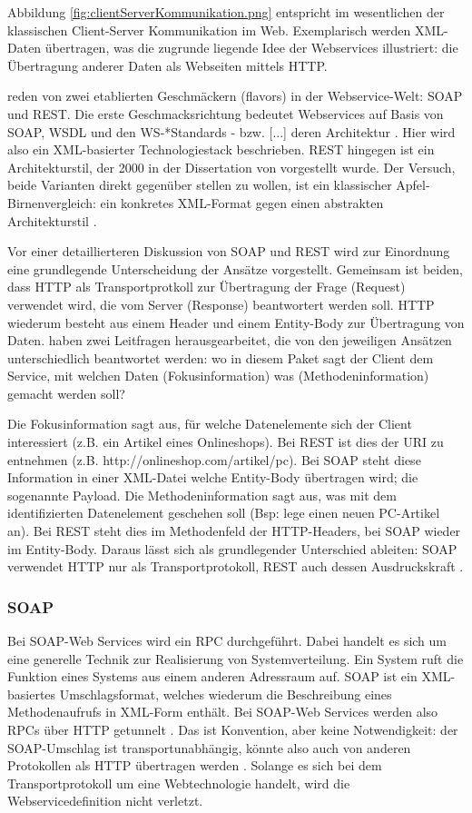 \documentclass[12pt,a4paper,bibliography=totocnumbered,listof=totoc]{scrartcl}
\begin{document}
Abbildung \ref{fig:clientServerKommunikation.png} entspricht im wesentlichen der klassischen Client-Server Kommunikation im Web. Exemplarisch werden XML-Daten übertragen, was die zugrunde liegende Idee der Webservices illustriert: die Übertragung anderer Daten als Webseiten mittels HTTP.

\citet{wilde11} reden von zwei etablierten \glqq Geschmäckern\grqq{} (flavors) in der Webservice-Welt: SOAP und REST. Die erste Geschmacksrichtung bedeutet Webservices \glqq auf Basis von SOAP, WSDL und den WS-*Standards - bzw. [...] deren Architektur\grqq{} \citep{tilkov11}. Hier wird also ein XML-basierter Technologiestack beschrieben. REST hingegen ist ein Architekturstil, der 2000 in der Dissertation von \citeauthor{fielding00} vorgestellt wurde. Der Versuch, beide Varianten direkt gegenüber stellen zu wollen, ist ein \glqq [...] klassischer Apfel-Birnenvergleich: ein konkretes XML-Format gegen einen abstrakten Architekturstil\grqq{} \citep{tilkov11}.

Vor einer detaillierteren Diskussion von SOAP und REST wird zur Einordnung eine grundlegende Unterscheidung der Ansätze vorgestellt. Gemeinsam ist beiden, dass HTTP als Transportprotkoll zur Übertragung der Frage (Request) verwendet wird, die vom Server (Response) beantwortert werden soll. HTTP wiederum besteht aus einem Header und einem Entity-Body zur Übertragung von Daten. \citet{richardson07} haben zwei Leitfragen herausgearbeitet, die von den jeweiligen Ansätzen unterschiedlich beantwortet werden: wo in diesem Paket sagt der Client dem Service, mit welchen Daten (Fokusinformation) was (Methodeninformation) gemacht werden soll?

Die Fokusinformation sagt aus, für welche Datenelemente sich der Client interessiert (z.B. ein Artikel eines Onlineshops). Bei REST ist dies der URI zu entnehmen (z.B. http://onlineshop.com/artikel/pc). Bei SOAP steht diese Information in einer XML-Datei welche Entity-Body übertragen wird; die sogenannte Payload. Die Methodeninformation sagt aus, was mit dem identifizierten Datenelement geschehen soll (Bsp: lege einen neuen PC-Artikel an). Bei REST steht dies im Methodenfeld der HTTP-Headers, bei SOAP wieder im Entity-Body. Daraus lässt sich als grundlegender Unterschied ableiten: SOAP verwendet HTTP nur als Transportprotokoll, REST auch dessen Ausdruckskraft \citep{wilde11}.

\subsubsection{SOAP}
Bei SOAP-Web Services wird ein \ac{RPC} durchgeführt. Dabei handelt es sich um eine generelle Technik zur Realisierung von Systemverteilung. Ein System ruft die Funktion eines Systems aus einem anderen Adressraum auf. SOAP ist ein XML-basiertes Umschlagsformat, welches wiederum die Beschreibung eines Methodenaufrufs in XML-Form enthält. Bei SOAP-Web Services werden also \ac{RPC}s über HTTP getunnelt \citep{wilde11}. Das ist Konvention, aber keine Notwendigkeit: der SOAP-Umschlag ist transportunabhängig, könnte also auch von anderen Protokollen als HTTP übertragen werden \citep{tilkov11}. Solange es sich bei dem Transportprotokoll um eine Webtechnologie handelt, wird die Webservicedefinition nicht verletzt.
\end{document}
